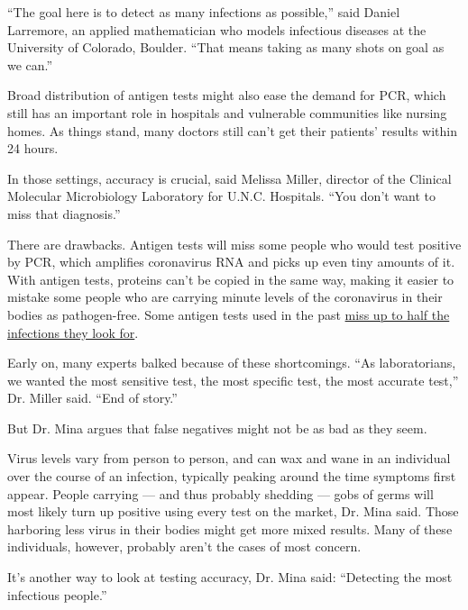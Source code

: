 ``The goal here is to detect as many infections as possible,'' said
Daniel Larremore, an applied mathematician who models infectious
diseases at the University of Colorado, Boulder. ``That means taking as
many shots on goal as we can.''

Broad distribution of antigen tests might also ease the demand for PCR,
which still has an important role in hospitals and vulnerable
communities like nursing homes. As things stand, many doctors still
can't get their patients' results within 24 hours.

In those settings, accuracy is crucial, said Melissa Miller, director of
the Clinical Molecular Microbiology Laboratory for U.N.C. Hospitals.
``You don't want to miss that diagnosis.''

There are drawbacks. Antigen tests will miss some people who would test
positive by PCR, which amplifies coronavirus RNA and picks up even tiny
amounts of it. With antigen tests, proteins can't be copied in the same
way, making it easier to mistake some people who are carrying minute
levels of the coronavirus in their bodies as pathogen-free. Some antigen
tests used in the past
\href{https://slack-redir.net/link?url=https\%3A\%2F\%2Fwww.cdc.gov\%2Fflu\%2Fprofessionals\%2Fdiagnosis\%2Fclinician_guidance_ridt.htm}{miss
up to half the infections they look for}.

Early on, many experts balked because of these shortcomings. ``As
laboratorians, we wanted the most sensitive test, the most specific
test, the most accurate test,'' Dr. Miller said. ``End of story.''

But Dr. Mina argues that false negatives might not be as bad as they
seem.

Virus levels vary from person to person, and can wax and wane in an
individual over the course of an infection, typically peaking around the
time symptoms first appear. People carrying --- and thus probably
shedding --- gobs of germs will most likely turn up positive using every
test on the market, Dr. Mina said. Those harboring less virus in their
bodies might get more mixed results. Many of these individuals, however,
probably aren't the cases of most concern.

It's another way to look at testing accuracy, Dr. Mina said: ``Detecting
the most infectious people.''

\href{https://www.nytimes3xbfgragh.onion/news-event/coronavirus?action=click\&pgtype=Article\&state=default\&region=MAIN_CONTENT_3\&context=storylines_faq}{}

